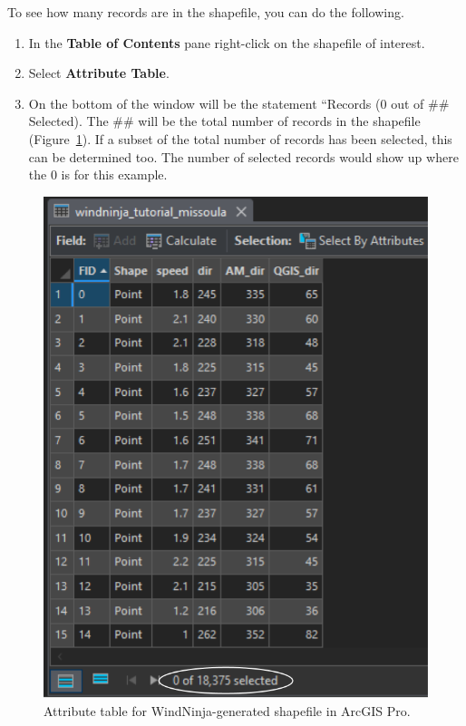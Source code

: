 \documentclass[12pt]{article}
\begin{document}
\pagebreak

To see how many records are in the shapefile, you can do the following.
\begin{enumerate}

\item In the \textbf{Table of Contents} pane right-click on the shapefile of interest.
\item  Select \textbf{Attribute Table}.
\item On the bottom of the window will be the statement “Records (0 out of \#\# Selected). The \#\# will be the total number of records in the shapefile (Figure~\ref{fig:Figure20}). If a subset of the total number of records has been selected, this can be determined too. The number of selected records would show up where the 0 is for this example.
\end{enumerate}

\begin{figure}[H]
	\centering
	\includegraphics[scale=0.45]{arc_20.png}
	\caption{Attribute table for WindNinja-generated shapefile in ArcGIS Pro.}
\label{fig:Figure20}
\end{figure}
\end{document}
